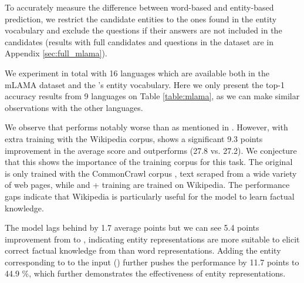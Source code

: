 \documentclass[11pt]{article}
\newcommand{\minisection}[1]{\noindent{\bf {#1}.}}
\newcommand{\Appendix}[1]{Appendix \ref{#1}}
\newcommand{\Table}[1]{Table \ref{#1}}
\begin{document}
To accurately measure the difference between word-based and entity-based prediction, we restrict the candidate entities to the ones found in the entity vocabulary and exclude the questions if their answers are not included in the candidates (results with full candidates and questions in the dataset are in \Appendix{sec:full_mlama}).


\minisection{Results}
We experiment in total with 16 languages which are available both in the mLAMA dataset and the \mluke{}'s entity vocabulary.
Here we only present the top-1 accuracy results from 9 languages on \Table{table:mlama}, as we can make similar observations with the other languages.

We observe that \xlmr{}\ba{} performs notably worse than \mbert{} as mentioned in \citet{kassner-etal-2021-multilingual}.
However, with extra training with the Wikipedia corpus, \xlmr{}\ba{} shows a significant 9.3 points improvement in the average score and outperforms \mbert{} (27.8 vs. 27.2).
We conjecture that this shows the importance of the training corpus for this task.
The original \xlmr{} is only trained with the CommonCrawl corpus \citep{conneau-etal-2020-unsupervised}, text scraped from a wide variety of web pages, while \mbert{} and \xlmr{} + training are trained on Wikipedia.
The performance gaps indicate that Wikipedia is particularly useful for the model to learn factual knowledge.

The \mlukeW{}\ba{} model lags behind \xlmr{}\ba{} \extraTraining{} by 1.7 average points but we can see 5.4 points improvement from \xlmr{}\ba{} \extraTraining{} to \mlukeEwithY{}, indicating entity representations are more suitable to elicit correct factual knowledge from \mluke{} than word representations.
Adding the entity corresponding to \X{} to the input (\mlukeEwithXY{}) further pushes the performance by 11.7 points to 44.9 \%, which further demonstrates the effectiveness of entity representations.
\end{document}
